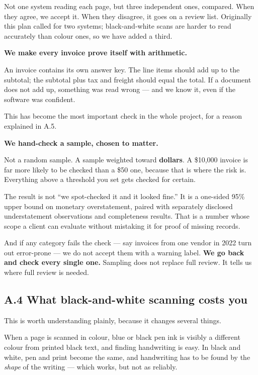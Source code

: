 \documentclass[
]{article}
\begin{document}
Not one system reading each page, but three independent ones, compared.
When they agree, we accept it. When they disagree, it goes on a review
list. Originally this plan called for two systems; black-and-white scans
are harder to read accurately than colour ones, so we have added a
third.

\textbf{We make every invoice prove itself with arithmetic.}

An invoice contains its own answer key. The line items should add up to
the subtotal; the subtotal plus tax and freight should equal the total.
If a document does not add up, something was read wrong --- and we know
it, even if the software was confident.

This has become the most important check in the whole project, for a
reason explained in A.5.

\textbf{We hand-check a sample, chosen to matter.}

Not a random sample. A sample weighted toward \textbf{dollars}. A
\$10,000 invoice is far more likely to be checked than a \$50 one,
because that is where the risk is. Everything above a threshold you set
gets checked for certain.

The result is not ``we spot-checked it and it looked fine.'' It is a
one-sided 95\% upper bound on monetary overstatement, paired with
separately disclosed understatement observations and completeness
results. That is a number whose scope a client can evaluate without
mistaking it for proof of missing records.

And if any category fails the check --- say invoices from one vendor in
2022 turn out error-prone --- we do not accept them with a warning
label. \textbf{We go back and check every single one.} Sampling does not
replace full review. It tells us where full review is needed.

\subsection{A.4 What black-and-white scanning costs
you}\label{a.4-what-black-and-white-scanning-costs-you}

This is worth understanding plainly, because it changes several things.

When a page is scanned in colour, blue or black pen ink is visibly a
different colour from printed black text, and finding handwriting is
easy. In black and white, pen and print become the same, and handwriting
has to be found by the \emph{shape} of the writing --- which works, but
not as reliably.
\end{document}

